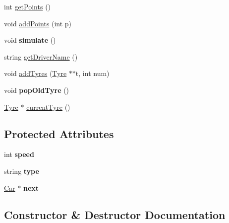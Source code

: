 \begin{DoxyCompactItemize}
\item 
int \hyperlink{classDepartmentOutput_ac1eac849b183dd78906a5b2a7217b8ef}{get\+Points} ()
\item 
void \hyperlink{classDepartmentOutput_a6ce74748aa402298902e378ff47c1e49}{add\+Points} (int p)
\item 
\mbox{\label{classDepartmentOutput_a3c189e28c9d8899afafe3d6ee7d7602d}} 
void {\bfseries simulate} ()
\item 
string \hyperlink{classDepartmentOutput_a5c2bbaa1979ecbbd06629440884966a0}{get\+Driver\+Name} ()
\item 
void \hyperlink{classDepartmentOutput_a7f231762cf94d1f18a2e7bb3290afbda}{add\+Tyres} (\hyperlink{classTyre}{Tyre} $\ast$$\ast$t, int num)
\item 
\mbox{\label{classDepartmentOutput_a9c1846e268ea5e85eb623d8011f204f5}} 
void {\bfseries pop\+Old\+Tyre} ()
\item 
\hyperlink{classTyre}{Tyre} $\ast$ \hyperlink{classDepartmentOutput_aca95508fd9145baea4e7a32448fa653b}{current\+Tyre} ()
\end{DoxyCompactItemize}
\subsection*{Protected Attributes}
\begin{DoxyCompactItemize}
\item 
\mbox{\label{classDepartmentOutput_a80415966e2307bbd8b7d6ec53a709ab7}} 
int {\bfseries speed}
\item 
\mbox{\label{classDepartmentOutput_a1f82ab864fefab53c1c72707a4de6a99}} 
string {\bfseries type}
\item 
\mbox{\label{classDepartmentOutput_a4bf4b9dd4707658be9f0573f493ec296}} 
\hyperlink{classCar}{Car} $\ast$ {\bfseries next}
\end{DoxyCompactItemize}


\subsection{Constructor \& Destructor Documentation}
\mbox{\label{classDepartmentOutput_af48d2aeafaead9c3f77c506112d80ca8}} 
